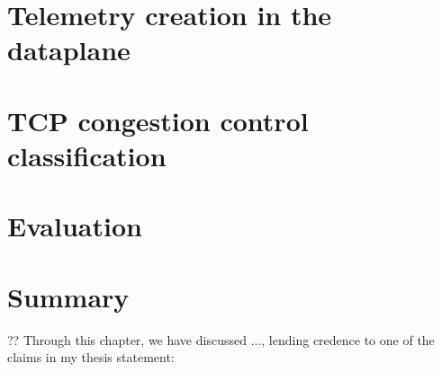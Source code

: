 \section{Telemetry creation in the dataplane}\label{sec:seidr-architecture}


\section{TCP congestion control classification}\label{sec:seidr-tcpcc}


\section{Evaluation}\label{sec:seidr-evaluation}


% 

\section{Summary}\label{sec:seidr-conclustion}


?? Through this chapter, we have discussed ..., lending credence to one of the claims in my thesis statement: 

